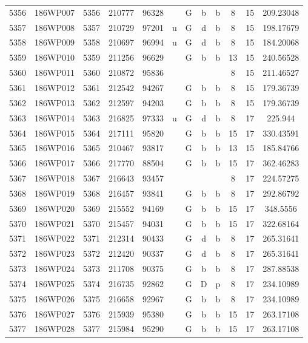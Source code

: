 \begin{tabular}{|*{12}{c|}}
5356 & 186WP007 & 5356 & 210777 & 96328 &  & G & b & b & 8 & 15 & 209.23048 \\ 
5357 & 186WP008 & 5357 & 210729 & 97201 & u & G & d & b & 8 & 15 & 198.17679 \\ 
5358 & 186WP009 & 5358 & 210697 & 96994 & u & G & d & b & 8 & 15 & 184.20068 \\ 
5359 & 186WP010 & 5359 & 211256 & 96629 &  & G & b & b & 13 & 15 & 240.56528 \\ 
5360 & 186WP011 & 5360 & 210872 & 95836 &  &  &  &  & 8 & 15 & 211.46527 \\ 
5361 & 186WP012 & 5361 & 212542 & 94267 &  & G & b & b & 8 & 15 & 179.36739 \\ 
5362 & 186WP013 & 5362 & 212597 & 94203 &  & G & b & b & 8 & 15 & 179.36739 \\ 
5363 & 186WP014 & 5363 & 216825 & 97333 & u & G & d & b & 8 & 17 & 225.944 \\ 
5364 & 186WP015 & 5364 & 217111 & 95820 &  & G & b & b & 15 & 17 & 330.43591 \\ 
5365 & 186WP016 & 5365 & 210467 & 93817 &  & G & b & b & 13 & 15 & 185.84766 \\ 
5366 & 186WP017 & 5366 & 217770 & 88504 &  & G & b & b & 15 & 17 & 362.46283 \\ 
5367 & 186WP018 & 5367 & 216643 & 93457 &  &  &  &  & 8 & 17 & 224.57275 \\ 
5368 & 186WP019 & 5368 & 216457 & 93841 &  & G & b & b & 8 & 17 & 292.86792 \\ 
5369 & 186WP020 & 5369 & 215552 & 94169 &  & G & b & b & 15 & 17 & 348.5556 \\ 
5370 & 186WP021 & 5370 & 215457 & 94031 &  & G & b & b & 15 & 17 & 322.68164 \\ 
5371 & 186WP022 & 5371 & 212314 & 90433 &  & G & d & b & 8 & 17 & 265.31641 \\ 
5372 & 186WP023 & 5372 & 212420 & 90337 &  & G & d & b & 8 & 17 & 265.31641 \\ 
5373 & 186WP024 & 5373 & 211708 & 90375 &  & G & b & b & 8 & 17 & 287.88538 \\ 
5374 & 186WP025 & 5374 & 216735 & 92862 &  & G & D & p & 8 & 17 & 234.10989 \\ 
5375 & 186WP026 & 5375 & 216658 & 92967 &  & G & b & b & 8 & 17 & 234.10989 \\ 
5376 & 186WP027 & 5376 & 215939 & 95380 &  & G & b & b & 15 & 17 & 263.17108 \\ 
5377 & 186WP028 & 5377 & 215984 & 95290 &  & G & b & b & 15 & 17 & 263.17108 \\ 

\end{tabular}
